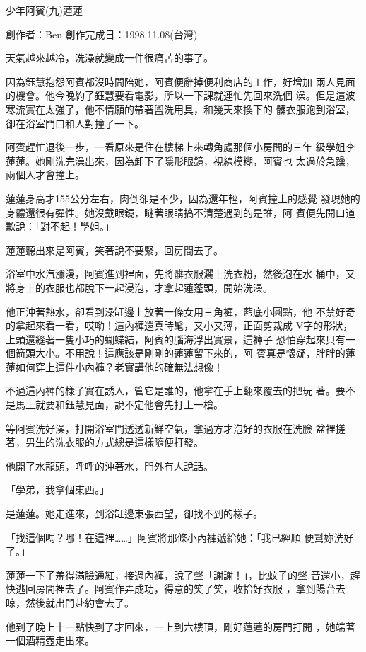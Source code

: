 



少年阿賓(九)蓮蓮

創作者：Ben
創作完成日：1998.11.08(台灣)


天氣越來越冷，洗澡就變成一件很痛苦的事了。

因為鈺慧抱怨阿賓都沒時間陪她，阿賓便辭掉便利商店的工作，好增加
兩人見面的機會。他今晚約了鈺慧要看電影，所以一下課就連忙先回來洗個
澡。但是這波寒流實在太強了，他不情願的帶著盥洗用具，和幾天來換下的
髒衣服跑到浴室，卻在浴室門口和人對撞了一下。

阿賓趕忙退後一步，一看原來是住在樓梯上來轉角處那個小房間的三年
級學姐李蓮蓮。她剛洗完澡出來，因為卸下了隱形眼鏡，視線模糊，阿賓也
太過於急躁，兩個人才會撞上。

蓮蓮身高才155公分左右，肉倒卻是不少，因為還年輕，阿賓撞上的感覺
發現她的身體還很有彈性。她沒戴眼鏡，瞇著眼睛搞不清楚遇到的是誰，阿
賓便先開口道歉說：「對不起！學姐。」

蓮蓮聽出來是阿賓，笑著說不要緊，回房間去了。

浴室中水汽瀰漫，阿賓進到裡面，先將髒衣服灑上洗衣粉，然後泡在水
桶中，又將身上的衣服也都脫下一起浸泡，才拿起蓮蓬頭，開始洗澡。

他正沖著熱水，卻看到澡缸邊上放著一條女用三角褲，藍底小圓點，他
不禁好奇的拿起來看一看，哎喲！這內褲還真時髦，又小又薄，正面剪裁成
V字的形狀，上頭還縫著一隻小巧的蝴蝶結，阿賓的腦海浮出實景，這褲子
恐怕穿起來只有一個箭頭大小。不用說！這應該是剛剛的蓮蓮留下來的，阿
賓真是懷疑，胖胖的蓮蓮如何穿上這件小內褲？老實講他的確無法想像！

不過這內褲的樣子實在誘人，管它是誰的，他拿在手上翻來覆去的把玩
著。要不是馬上就要和鈺慧見面，說不定他會先打上一槍。

等阿賓洗好澡，打開浴室門透透新鮮空氣，拿過方才泡好的衣服在洗臉
盆裡搓著，男生的洗衣服的方式總是這樣隨便打發。

他開了水龍頭，呼呼的沖著水，門外有人說話。

「學弟，我拿個東西。」

是蓮蓮。她走進來，到浴缸邊東張西望，卻找不到的樣子。

「找這個嗎？哪！在這裡……」阿賓將那條小內褲遞給她：「我已經順
便幫妳洗好了。」

蓮蓮一下子羞得滿臉通紅，接過內褲，說了聲「謝謝！」，比蚊子的聲
音還小，趕快逃回房間裡去了。阿賓作弄成功，得意的笑了笑，收拾好衣服
，拿到陽台去晾，然後就出門赴約會去了。

他到了晚上十一點快到了才回來，一上到六樓頂，剛好蓮蓮的房門打開
，她端著一個酒精壺走出來。

